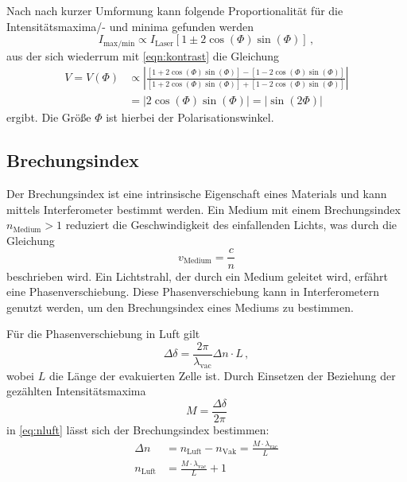 Nach nach kurzer Umformung kann 
folgende Proportionalität für die Intensitätsmaxima/- und minima gefunden werden
\begin{equation*}
    I_\text{max/min} \propto I_\text{Laser} \left[ 1 \pm 2 \cos(\Phi) \sin (\Phi) \right] \, ,
\end{equation*}
aus der sich wiederrum mit \autoref{eqn:kontrast} die Gleichung
\begin{align}\label{eqn:kontrast2}
    V = V(\Phi) &\propto \left|\frac{\left[ 1 + 2 \cos(\Phi) \sin (\Phi) \right] - \left[ 1 - 2 \cos(\Phi) \sin (\Phi) \right]}{\left[ 1 + 2 \cos(\Phi) \sin (\Phi) \right] + \left[ 1 - 2 \cos(\Phi) \sin (\Phi) \right]}\right| \\
    &= \left|2 \cos(\Phi) \sin(\Phi) \right| = \left| \sin (2 \Phi) \right|
\end{align}
ergibt. %
Die Größe $\Phi$ ist hierbei der Polarisationswinkel. 
\subsection{Brechungsindex} \label{sec:n}

Der Brechungsindex ist eine intrinsische Eigenschaft eines Materials und kann mittels Interferometer bestimmt werden. Ein Medium mit einem Brechungsindex $n_\text{Medium} > 1$ reduziert die Geschwindigkeit des einfallenden Lichts, was durch die Gleichung
\begin{equation*}
    v_\text{Medium} = \frac{c}{n}
\end{equation*}
beschrieben wird. Ein Lichtstrahl, der durch ein Medium geleitet wird, erfährt eine Phasenverschiebung. Diese Phasenverschiebung kann in Interferometern genutzt werden, um den Brechungsindex eines Mediums zu bestimmen.

Für die Phasenverschiebung in Luft gilt
\begin{equation} \label{eq:nluft}
    \Delta \delta = \frac{2 \pi}{\lambda_\text{vac}} \Delta n \cdot L \, ,
\end{equation}
wobei $L$ die Länge der evakuierten Zelle ist. Durch Einsetzen der Beziehung der gezählten Intensitätsmaxima 
\begin{equation} \label{eq:maxima}
    M = \frac{\Delta \delta}{2 \pi}
\end{equation}
in \autoref{eq:nluft} lässt sich der Brechungsindex bestimmen:
\begin{align} \label{eq:nluft2}
    \Delta n &= n_\text{Luft} - n_\text{Vak} = \frac{M \cdot \lambda_\text{vac}}{L} \nonumber \\
    n_\text{Luft} &= \frac{M \cdot \lambda_\text{vac}}{L} + 1
\end{align}


